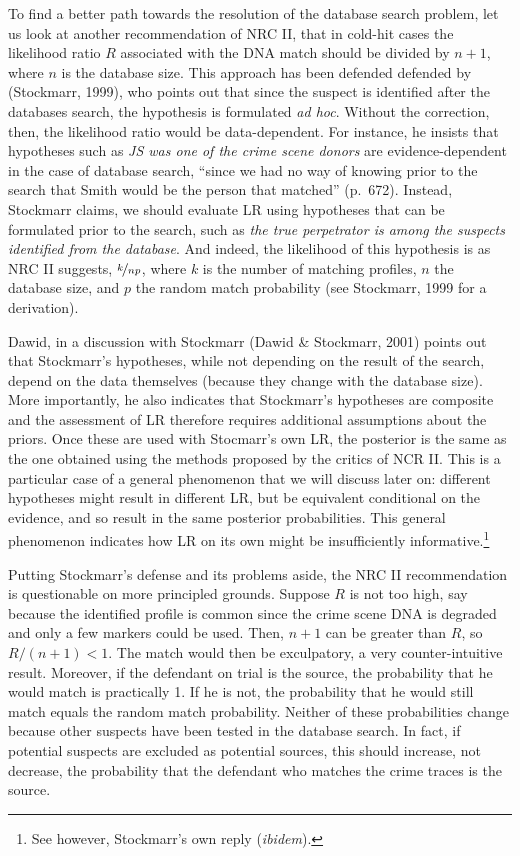 \documentclass[
  10pt,
  dvipsnames,enabledeprecatedfontcommands]{scrartcl}
\begin{document}
To find a better path towards the resolution of the database search
problem, let us look at another recommendation of NRC II, that in
cold-hit cases the likelihood ratio \(R\) associated with the DNA match
should be divided by \(n+1\), where \(n\) is the database size. This
approach has been defended defended by (Stockmarr, 1999), who points out
that since the suspect is identified after the databases search, the
hypothesis is formulated \textit{ad hoc}. Without the correction, then,
the likelihood ratio would be data-dependent. For instance, he insists
that hypotheses such as \emph{JS was one of the crime scene donors} are
evidence-dependent in the case of database search, ``since we had no way
of knowing prior to the search that Smith would be the person that
matched'' (p.~672). Instead, Stockmarr claims, we should evaluate LR
using hypotheses that can be formulated prior to the search, such as
\emph{the true perpetrator is among the suspects identified from the database}.
And indeed, the likelihood of this hypothesis is as NRC II suggests,
\(\nicefrac{k}{np}\), where \(k\) is the number of matching profiles,
\(n\) the database size, and \(p\) the random match probability (see
Stockmarr, 1999 for a derivation).

Dawid, in a discussion with Stockmarr (Dawid \& Stockmarr, 2001) points
out that Stockmarr's hypotheses, while not depending on the result of
the search, depend on the data themselves (because they change with the
database size). More importantly, he also indicates that Stockmarr's
hypotheses are composite and the assessment of LR therefore requires
additional assumptions about the priors. Once these are used with
Stocmarr's own LR, the posterior is the same as the one obtained using
the methods proposed by the critics of NCR II. This is a particular case
of a general phenomenon that we will discuss later on: different
hypotheses might result in different LR, but be equivalent conditional
on the evidence, and so result in the same posterior probabilities. This
general phenomenon indicates how LR on its own might be insufficiently
informative.\footnote{See however, Stockmarr's own reply
  (\emph{ibidem}).}

Putting Stockmarr's defense and its problems aside, the NRC II
recommendation is questionable on more principled grounds. Suppose \(R\)
is not too high, say because the identified profile is common since the
crime scene DNA is degraded and only a few markers could be used. Then,
\(n+1\) can be greater than \(R\), so \(R/(n+1)<1\). The match would
then be exculpatory, a very counter-intuitive result. Moreover, if the
defendant on trial is the source, the probability that he would match is
practically 1. If he is not, the probability that he would still match
equals the random match probability. Neither of these probabilities
change because other suspects have been tested in the database search.
In fact, if potential suspects are excluded as potential sources, this
should increase, not decrease, the probability that the defendant who
matches the crime traces is the source.
\end{document}
